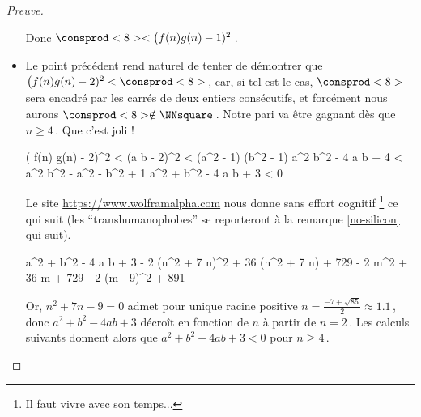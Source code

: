 \begin{proof}[Preuve]
\begin{itemize}
        \noindent
        Donc $\consprod<8> < \big( f(n) g(n) - 1)^2$\,.
    
    
    	\item Le point précédent rend naturel de tenter de démontrer que 
    	$\big( f(n) g(n) - 2)^2 < \consprod<8>$\,, car, si tel est le cas, 
    	$\consprod<8>$ sera encadré par les carrés de deux entiers consécutifs, et forcément nous aurons $\consprod<8> \notin \NNsquare$\,. 
    	Notre pari va être gagnant dès que $n \geq 4$\,.
    	Que c'est joli !
    
        \medskip
        \noindent\kern-6pt%
        \begin{stepcalc}[style = ar*, ope={\iff}]
        	\big( f(n) g(n) - 2)^2 < \consprod<8>
        	(a b - 2)^2 < (a^2 - 1) (b^2 - 1)
        \explnext{}
        	a^2 b^2 - 4 a b + 4 < a^2 b^2 - a^2 - b^2 + 1
        \explnext{}
        	a^2 + b^2 - 4 a b + 3 < 0
        \end{stepcalc}
    
        \medskip
        \noindent
        Le site \url{https://www.wolframalpha.com} nous donne sans effort cognitif
        \footnote{
        	Il faut vivre avec son temps...
        }
        ce qui suit (les \enquote{transhumanophobes} se reporteront à la remarque \ref{no-silicon} qui suit).
    
        \medskip
        \noindent\kern-6pt%
        \begin{stepcalc}[style = ar*, ope={=}]
        	a^2 + b^2 - 4 a b + 3
        \explnext{}
        	- 2 (n^2 + 7 n)^2 + 36 (n^2 + 7 n) + 729
        	- 2 m^2 + 36 m + 729
        \explnext{}
        	- 2 (m - 9)^2 + 891
        \end{stepcalc}
        
        \medskip
        
        \noindent
        Or, $n^2 + 7 n - 9 = 0$ admet pour unique racine positive $n = \frac{- 7 + \sqrt{85}}{2} \approx \num{1.1}$\,,
        donc $a^2 + b^2 - 4 a b + 3$ décroît en fonction de $n$ à partir de $n = 2$\,. Les calculs suivants donnent alors que $a^2 + b^2 - 4 a b + 3 < 0$ pour $n \geq 4$\,.
    \end{itemize}
    
    \begin{center}
    \end{center}
    

\end{proof}
